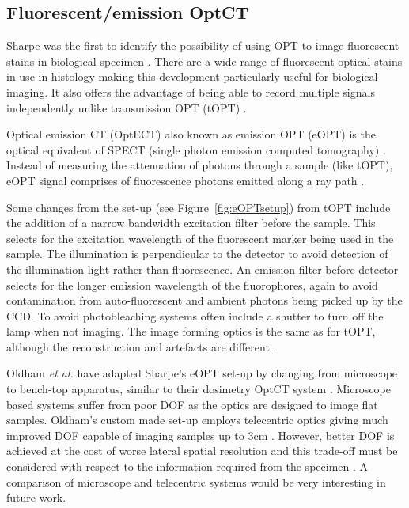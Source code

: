 \subsection{Fluorescent/emission  OptCT}
\label{subsec:eOPT}

Sharpe was the first to identify the possibility of using OPT to image fluorescent stains in biological specimen \cite{Sharpe:2002jp}. There are a wide range of fluorescent optical stains in use in histology making this development particularly useful for biological imaging. It also offers the advantage of being able to record multiple signals independently unlike  transmission OPT (tOPT) \cite{Sharpe:2002jp}. 


Optical emission CT (OptECT) also known as emission OPT (eOPT) is the optical equivalent of SPECT (single photon emission computed tomography) \cite{Oldham:2007ku}.  Instead of measuring the attenuation of photons through a sample (like tOPT), eOPT signal comprises of fluorescence photons emitted along a ray path \cite{Walls:2005ja}.



Some changes from the set-up (see Figure~\ref{fig:eOPTsetup}) from tOPT  include the addition of a narrow bandwidth excitation filter before the sample. This selects for the excitation wavelength of the fluorescent marker being used in the sample. The illumination is perpendicular to the detector to avoid detection of the illumination light rather than fluorescence. An emission filter before detector selects for the longer emission wavelength of the fluorophores, again to avoid contamination from auto-fluorescent and ambient photons being picked up by the CCD. To avoid photobleaching systems often include a shutter to turn off the lamp when not imaging.  The image forming optics is the same as for tOPT, although the reconstruction and artefacts are different \cite{Walls:2005ja}.



Oldham \textit{et al.} have adapted Sharpe's eOPT set-up by changing from microscope to bench-top apparatus, similar to their dosimetry OptCT system \cite{Oldham:2006, Oldham:2007ku}. Microscope based systems suffer from poor DOF as the optics are designed to image flat samples.  Oldham's custom made set-up employs telecentric optics giving much improved DOF capable of imaging samples up to 3cm \cite{Oldham:2007ku}. However, better DOF is achieved at the cost of worse lateral spatial resolution and this trade-off must be considered with respect to the information required from the specimen \cite{Krstajic:2006kna}.   A comparison of microscope and telecentric systems would be very interesting in future work.



